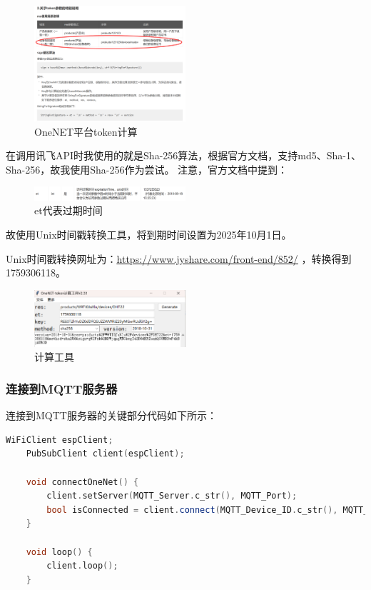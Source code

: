 \begin{figure} [H]
    \centering
    \includegraphics[width=0.5\textwidth]{img/MQTT_Auth.png}
    \caption{OneNET平台token计算}
\end{figure}

在调用讯飞API时我使用的就是Sha-256算法，根据官方文档，支持md5、Sha-1、Sha-256，故我使用Sha-256作为尝试。
注意，官方文档中提到：

\begin{figure} [H]
    \centering
    \includegraphics[width=0.5\textwidth]{img/Noteet.png}
    \caption{et代表过期时间}
\end{figure}

故使用Unix时间戳转换工具，将到期时间设置为2025年10月1日。

Unix时间戳转换网址为：\href{https://www.jyshare.com/front-end/852/}{\underline{https://www.jyshare.com/front-end/852/}}
，转换得到1759306118。

\begin{figure} [H]
    \centering
    \includegraphics[width=0.5\textwidth]{img/MQTT_sha256.png}
    \caption{计算工具}
    \label{fig:MQTT_sha256}
\end{figure}

\subsubsection{连接到MQTT服务器}

连接到MQTT服务器的关键部分代码如下所示：

\begin{lstlisting}[language=C++, title=MQTT Connect]
    WiFiClient espClient;
    PubSubClient client(espClient);

    void connectOneNet() {
        client.setServer(MQTT_Server.c_str(), MQTT_Port);
        bool isConnected = client.connect(MQTT_Device_ID.c_str(), MQTT_Product_ID.c_str(), MQTT_Token.c_str());
    }

    void loop() {
        client.loop();
    }
\end{lstlisting}

